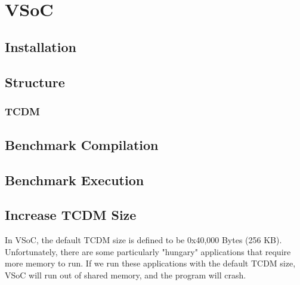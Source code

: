 \documentclass{article}
\title{
\vspace{2in}
\textmd{\textbf{\hmwkClass}}\\
\textmd{\textbf{\hmwkTitle}}\\
\normalsize\vspace{0.1in}\small{\hmwkDueDate}\\
\vspace{0.1in}\large{\textit{\hmwkClassInstructor}}
\vspace{3in}
}
\author{\textbf{\hmwkAuthorName}}
\date{}
\begin{document}
\maketitle


\setcounter{tocdepth}{3} %

\newpage
\tableofcontents
\newpage




\section{VSoC}

\subsection{Installation}
\subsection{Structure}
\subsubsection{TCDM}

\subsection{Benchmark Compilation}
\subsection{Benchmark Execution}
\subsection{Increase TCDM Size}
In VSoC, the default TCDM size is defined to be 0x40,000 Bytes (256 KB).  Unfortunately,  there are some particularly "hungary" applications that require more memory to run.  If we run these applications with the default TCDM size, VSoC will run out of shared memory, and the program will crash. 
\end{document}

